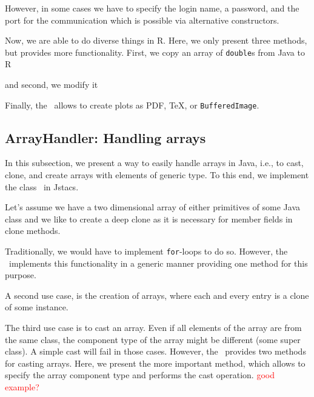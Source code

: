 \addtocounter{off}{7}

However, in some cases we have to specify the login name, a password, and the port for the communication which is possible via alternative constructors.

Now, we are able to do diverse things in R. Here, we only present three methods, but \REnvironment provides more functionality. First, we copy an array of \lstinline+double+s from Java to R 

\addtocounter{off}{4}

and second, we modify it 


Finally, the \REnvironment~allows to create plots as PDF, TeX, or \lstinline+BufferedImage+. 

\addtocounter{off}{3}

\subsection{ArrayHandler: Handling arrays}

In this subsection, we present a way to easily handle arrays in Java, i.e., to cast, clone, and create arrays with elements of generic type. To this end, we implement the class \ArrayHandler~in Jstacs. 

Let's assume we have a two dimensional array of either primitives of some Java class and we like to create a deep clone as it is necessary for member fields in clone methods.

\addtocounter{off}{2}

Traditionally, we would have to implement \lstinline+for+-loops to do so. However, the \ArrayHandler~implements this functionality in a generic manner providing one method for this purpose.

\addtocounter{off}{2}

A second use case, is the creation of arrays, where each and every entry is a clone of some instance.

\addtocounter{off}{3}

The third use case is to cast an array. Even if all elements of the array are from the same class, the component type of the array might be different (some super class). A simple cast will fail in those cases. However, the \ArrayHandler~provides two methods for casting arrays. Here, we present the more important method, which allows to specify the array component type and performs the cast operation. \textcolor{red}{good example?}

